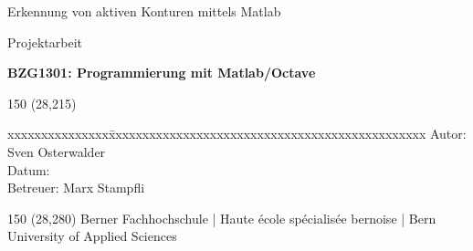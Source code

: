 \begin{titlepage}
\begin{flushleft}

\vspace*{120mm}

\fontsize{26pt}{28pt}\selectfont
Erkennung von aktiven Konturen mittels Matlab
\vspace{3mm}

\fontsize{20pt}{22pt}\selectfont
Projektarbeit
\vspace{3mm}

\fontsize{10pt}{12pt}\selectfont
\textbf{BZG1301: Programmierung mit Matlab/Octave} \\
\vspace{3mm}

\begin{textblock}{150} (28,215)
\fontsize{10pt}{17pt}\selectfont
\begin{tabbing}
xxxxxxxxxxxxxxx\=xxxxxxxxxxxxxxxxxxxxxxxxxxxxxxxxxxxxxxxxxxxxxxx \kill
Autor:        \> Sven Osterwalder\\
Datum:        \> \versiondate\\
Betreuer:     \> Marx Stampfli\\
\end{tabbing}

\end{textblock}
\end{flushleft}

\begin{textblock}{150} (28,280)
\noindent 
\color{bfhgrey}\fontsize{9pt}{10pt}\selectfont
Berner Fachhochschule | Haute école spécialisée bernoise | Bern University of Applied Sciences
\color{black}\selectfont
\end{textblock}


\end{titlepage}
